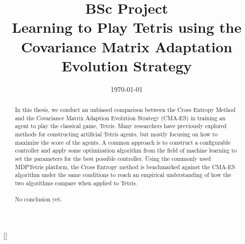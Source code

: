 







\title{BSc Project\\\textbf{Learning to Play Tetris using
    the Covariance Matrix Adaptation
    Evolution Strategy}}
\date{\today}
\maketitle

\tableofcontents

\clearpage

\begin{abstract}
In this thesis, we conduct an unbiased comparison between 
the Cross Entropy Method and the Covariance Matrix Adaption
Evolution Strategy (CMA-ES) in training 
an agent to play the classical game, Tetris. Many researchers have 
previously explored methods for constructing artificial Tetris
agents, but mostly focusing on how to maximize the score of the agents.
A common approach is to construct a configurable controller
and apply some optimization algorithm from the field of machine learning
to set the parameters for the best possible controller. Using the 
commonly used MDPTetris \citep{mdptetris} platform, the Cross Entropy
method is benchmarked against the CMA-ES algorithm under the same
conditions to reach an empirical understanding of how the two algorithms
compare when applied to Tetris.\\
\\
No conclusion yet.
\end{abstract}












[]


\begin{appendices}



\end{appendices}


